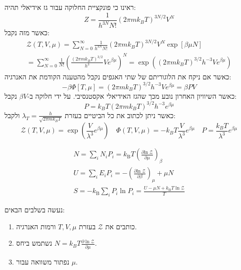 \documentclass{tstextbook}
\begin{document}
\begin{example}
ראינו כי פונקציית החלוקה עבור גז אידיאלי תהיה:
$$Z=\frac{1}{h^{3N}N!}\left(2\pi m k_{B}T\right)^{3N/2}V^{N}$$
כאשר מזה נקבל:
\begin{gather*}{\mathcal{Z}}\left( T,V,\mu \right)=\sum_{N=0}^{\infty}{\frac{1}{h^{3N}N!}}\left(2\pi m k_{B}T\right)^{3N/2}V^{N}\exp\left[\beta\mu N\right]\\=\sum_{N=0}^{\infty}\frac{1}{N!}\left(\frac{\left(2\pi m k_{B}T\right)^{3/2}}{h^{3}}V e^{\beta\mu}\right)^{N}=\exp\left(\left(2\pi m k_{B}T\right)^{3/2}h^{-3}V e^{\beta\mu}\right) 
\end{gather*}
כאשר אם ניקח את הלוגוריתם של שתי האגפים נקבל מהטענה הקודמת את האנרגיה:
$$-\beta \Phi[T,\mu]=\left(2\pi m k_{B}T\right)^{3/2}h^{-3}V e^{\beta\mu}=\beta P V$$
כאשר השיוויון האחרון נובע מכך שהגז האידיאלי אקסטנסיבי. על ידי חלוקה ב-\(\beta V\) נקבל:
$$P=k_{B}T\left(2\pi m k_{B}T\right)^{3/2}h^{-3}e^{\beta\mu}$$
כאשר ניתן לכתוב את כל הביטיים בעזרת \(\lambda_{T}=\frac{h}{\sqrt{ 2\pi mk_{B}T }}\) ולקבל:
$${\mathcal{Z}}\left( T,V,\mu \right)=\exp\left({\frac{V}{\lambda^{3}}}e^{\beta\mu}\right)\quad \Phi\left( T,V,\mu \right)=-k_{B}T\frac{V}{\lambda^{3}}e^{\beta\mu}\quad P=\frac{k_{B}T}{\lambda^{3}}e^{\beta\mu}$$

\end{example}
\begin{proposition}
\begin{gather*}N=\sum_{i}N_{i}P_{i}=k_{\mathrm{B}}T\left({\frac{\partial\mathrm{ln}\;{\mathcal{Z}}}{\partial\mu}}\right)_{\beta}\\ U=\sum_{i}E_{i}P_{i}=-\left(\frac{\partial\mathrm{ln}\;\mathcal{Z}}{\partial\beta}\right)_{\mu}+\mu N\\ S=-k_{\mathrm{B}}\sum_{i}P_{i}\ln P_{i}={\frac{U-\mu N+k_{\mathrm{B}}T\ln{\mathcal{Z}}}{T}} 
\end{gather*}

\end{proposition}
\begin{proposition}
נעשה בשלבים הבאים:

  \begin{enumerate}
    \item כותבים את \(\mathcal{Z}\) בעזרת \(T,V,\mu\) ורמות האנרגיה. 


    \item נשתמש ביחס \(N=k_{B}T \frac{\partial \ln \mathcal{Z}}{\partial \mu}\). 


    \item נפתור משוואה עבור \(\mu\). 


  \end{enumerate}
\end{proposition}
\end{document}
